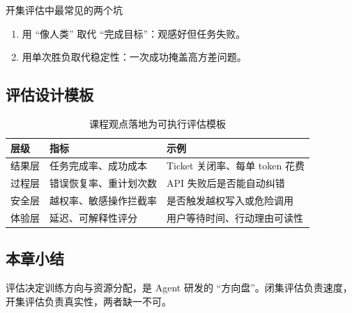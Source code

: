 \begin{warningbox}{开集评估中最常见的两个坑}
\begin{enumerate}
    \item 用 ``像人类'' 取代 ``完成目标''：观感好但任务失败。
    \item 用单次胜负取代稳定性：一次成功掩盖高方差问题。
\end{enumerate}
\end{warningbox}

\subsection{评估设计模板}
\begin{table}[H]
\centering
\begin{tabular}{p{3.0cm}p{4.0cm}p{4.8cm}}
\toprule
\textbf{层级} & \textbf{指标} & \textbf{示例} \\
\midrule
结果层 & 任务完成率、成功成本 & Ticket 关闭率、每单 token 花费 \\
过程层 & 错误恢复率、重计划次数 & API 失败后是否能自动纠错 \\
安全层 & 越权率、敏感操作拦截率 & 是否触发越权写入或危险调用 \\
体验层 & 延迟、可解释性评分 & 用户等待时间、行动理由可读性 \\
\bottomrule
\end{tabular}
\caption{课程观点落地为可执行评估模板}
\end{table}

\subsection{本章小结}
评估决定训练方向与资源分配，是 Agent 研发的 ``方向盘''。闭集评估负责速度，开集评估负责真实性，两者缺一不可。


